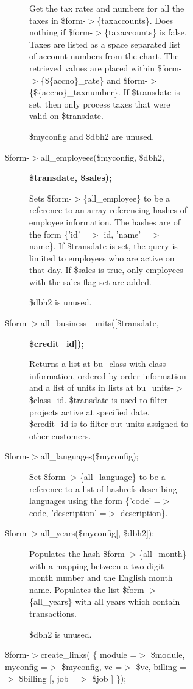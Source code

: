 \begin{description}
\begin{description}
\begin{description}
\begin{description}
\begin{description}
\begin{description}
Get the tax rates and numbers for all the taxes in \$form-$>$\{taxaccounts\}.  Does
nothing if \$form-$>$\{taxaccounts\} is false.  Taxes are listed as a space separated
list of account numbers from the chart.  The retrieved values are placed within
\$form-$>$\{\$\{accno\}\_rate\} and \$form-$>$\{\$\{accno\}\_taxnumber\}.  If \$transdate is set,
then only process taxes that were valid on \$transdate.



\$myconfig and \$dbh2 are unused.


\item[{\$form-$>$all\_employees(\$myconfig, \$dbh2,}] \textbf{\$transdate, \$sales);}

Sets \$form-$>$\{all\_employee\} to be a reference to an array referencing hashes of
employee information.  The hashes are of the form \{'id' =$>$ id, 'name' =$>$ name\}.
If \$transdate is set, the query is limited to employees who are active on that
day.  If \$sales is true, only employees with the sales flag set are added.



\$dbh2 is unused.


\item[{\$form-$>$all\_business\_units([\$transdate,}] \textbf{\$credit\_id]);}

Returns a list at bu\_class with class information, ordered by order information
and a list of units in lists at bu\_units-$>$\$class\_id.  \$transdate is used to
filter projects active at specified date.  \$credit\_id is to filter out 
units assigned to other customers.


\item[{\$form-$>$all\_languages(\$myconfig);}] \mbox{}

Set \$form-$>$\{all\_language\} to be a reference to a list of hashrefs describing
languages using the form \{'code' =$>$ code, 'description' =$>$ description\}.


\item[{\$form-$>$all\_years(\$myconfig[, \$dbh2]);}] \mbox{}

Populates the hash \$form-$>$\{all\_month\} with a mapping between a two-digit month
number and the English month name.  Populates the list \$form-$>$\{all\_years\} with
all years which contain transactions.



\$dbh2 is unused.


\item[{\$form-$>$create\_links( \{ module =$>$ \$module,     myconfig =$>$ \$myconfig, vc =$>$ \$vc, billing =$>$ \$billing [, job =$>$ \$job ] \});}] \mbox{}


\end{description}
\end{description}
\end{description}
\end{description}
\end{description}
\end{description}
